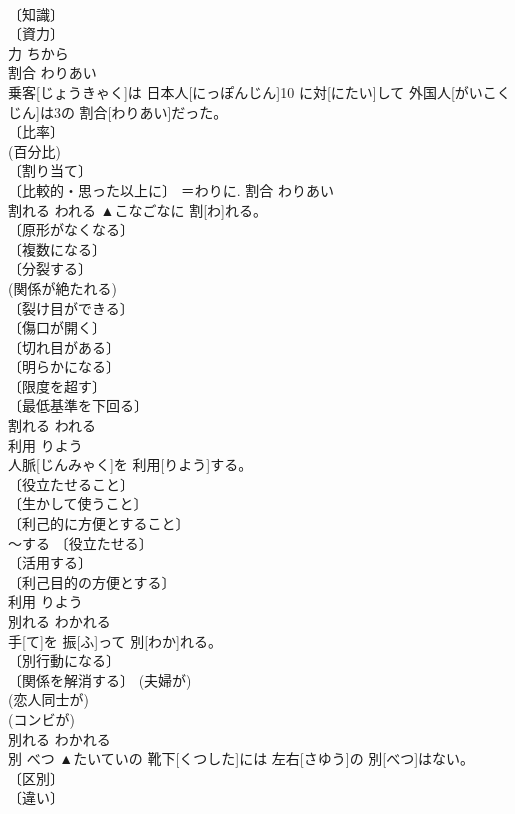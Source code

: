 \documentclass[8pt]{extreport}
\begin{document}
\begin{CJK}{UTF8}{min}
\\	〔知識〕 
\\	〔資力〕 
\\	力	ちから	
\\	割合	わりあい	
\\	乗客[じょうきゃく]は 日本人[にっぽんじん]10 に対[にたい]して 外国人[がいこくじん]は3の 割合[わりあい]だった。	
\\	〔比率〕 
\\	(百分比) 
\\	〔割り当て〕 
\\	〔比較的・思った以上に〕 ＝わりに.	割合	わりあい	
\\	割れる	われる	▲こなごなに 割[わ]れる。	
\\	〔原形がなくなる〕 
\\	〔複数になる〕 
\\	〔分裂する〕 
\\	(関係が絶たれる) 
\\	〔裂け目ができる〕 
\\	〔傷口が開く〕 
\\	〔切れ目がある〕 
\\	〔明らかになる〕 
\\	〔限度を超す〕 
\\	〔最低基準を下回る〕 
\\	割れる	われる	
\\	利用	りよう	
\\	人脈[じんみゃく]を 利用[りよう]する。	
\\	〔役立たせること〕 
\\	〔生かして使うこと〕 
\\	〔利己的に方便とすること〕 
\\	～する 〔役立たせる〕 
\\	〔活用する〕 
\\	〔利己目的の方便とする〕 
\\	利用	りよう	
\\	別れる	わかれる	
\\	手[て]を 振[ふ]って 別[わか]れる。	
\\	〔別行動になる〕 
\\	〔関係を解消する〕 (夫婦が) 
\\	(恋人同士が) 
\\	(コンビが) 
\\	別れる	わかれる	
\\	別	べつ	▲たいていの 靴下[くつした]には 左右[さゆう]の 別[べつ]はない。	
\\	〔区別〕 
\\	〔違い〕 

\end{CJK}
\end{document}
